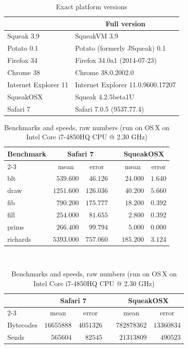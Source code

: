 \documentclass[natbib]{sigplanconf}
\begin{document}
\begin{table}[h]
  \centering
{\footnotesize
\begin{tabular}{ll}
\toprule
\multicolumn{1}{l}{ }&\multicolumn{1}{c}{Full version}\tabularnewline
\midrule
Squeak 3.9&SqueakVM 3.9\tabularnewline
Potato 0.1&Potato (formerly JSqueak) 0.1\tabularnewline
Firefox 34&Firefox 34.0a1 (2014-07-23)\tabularnewline
Chrome 38&Chrome 38.0.2002.0\tabularnewline
Internet Explorer 11&Internet Explorer 11.0.9600.17207\tabularnewline
SqueakOSX&Squeak 4.2.5beta1U\tabularnewline
Safari 7&Safari 7.0.5 (9537.77.4)\tabularnewline
\bottomrule
\end{tabular}}

  \caption{Exact platform versions}
  \label{tab:platforms}
\end{table}
\begin{table}[h]
 \centering
{\footnotesize
\begin{tabular}{lr@{\,\si{\milli\second} \ensuremath{\pm}}rcr@{\,\si{\milli\second} \ensuremath{\pm}}r}
\toprule
\multicolumn{1}{l}{\bfseries Benchmark}&\multicolumn{2}{c}{\bfseries Safari 7}&\multicolumn{1}{c}{\bfseries }&\multicolumn{2}{c}{\bfseries SqueakOSX}\tabularnewline
\cline{2-3} \cline{5-6}
\multicolumn{1}{l}{}&\multicolumn{1}{c}{mean}&\multicolumn{1}{c}{error}&\multicolumn{1}{c}{}&\multicolumn{1}{c}{mean}&\multicolumn{1}{c}{error}\tabularnewline
\midrule
blt&$ 539.600$&$ 46.126$&&$ 24.000$&$1.640$\tabularnewline
draw&$1251.600$&$126.036$&&$ 40.200$&$5.660$\tabularnewline
fib&$ 790.200$&$175.777$&&$ 18.200$&$0.392$\tabularnewline
fill&$ 254.000$&$ 81.655$&&$  2.800$&$0.392$\tabularnewline
prims&$ 266.400$&$ 99.794$&&$  5.000$&$0.000$\tabularnewline
richards&$5393.000$&$757.060$&&$185.200$&$3.124$\tabularnewline
\bottomrule
\end{tabular}}
\\
{\footnotesize
\begin{tabular}{lrrcrr}
\toprule
\multicolumn{1}{l}{\bfseries  }&\multicolumn{2}{c}{\bfseries Safari 7}&\multicolumn{1}{c}{\bfseries }&\multicolumn{2}{c}{\bfseries SqueakOSX}\tabularnewline
\cline{2-3} \cline{5-6}
\multicolumn{1}{l}{}&\multicolumn{1}{c}{mean}&\multicolumn{1}{c}{error}&\multicolumn{1}{c}{}&\multicolumn{1}{c}{mean}&\multicolumn{1}{c}{error}\tabularnewline
\midrule
Bytecodes&$16655888$&$4051326$&&$782878362$&$13360834$\tabularnewline
Sends&$  565604$&$  82545$&&$ 21313809$&$  490523$\tabularnewline
\bottomrule
\end{tabular}}

  \caption{Benchmarks and speeds, raw numbers (run on OS\,X on Intel Core
    i7-4850HQ CPU @ 2.30 GHz) }
  \label{tab:osx}
\end{table}
\end{document}
